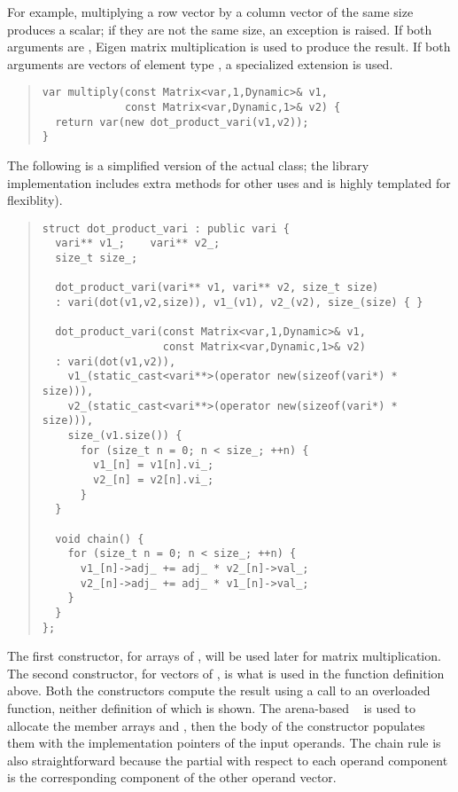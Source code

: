 \documentclass[10pt]{article}
\begin{document}
For example, multiplying a row vector by a column vector of the same
size produces a scalar; if they are not the same size, an exception is
raised.  If both arguments are , Eigen matrix
multiplication is used to produce the result.  If both arguments are
vectors of element type , a specialized 
extension is used.
%
\begin{quote}
\begin{Verbatim}
var multiply(const Matrix<var,1,Dynamic>& v1,
             const Matrix<var,Dynamic,1>& v2) {
  return var(new dot_product_vari(v1,v2));
}
\end{Verbatim}
\end{quote}
%
The following is a simplified version of the actual
 class; the library implementation includes
extra methods for other uses and is highly templated for flexiblity).
%
\begin{quote}
\begin{Verbatim}
struct dot_product_vari : public vari {
  vari** v1_;    vari** v2_;
  size_t size_;
  
  dot_product_vari(vari** v1, vari** v2, size_t size) 
  : vari(dot(v1,v2,size)), v1_(v1), v2_(v2), size_(size) { }

  dot_product_vari(const Matrix<var,1,Dynamic>& v1,
                   const Matrix<var,Dynamic,1>& v2)
  : vari(dot(v1,v2)),
    v1_(static_cast<vari**>(operator new(sizeof(vari*) * size))),
    v2_(static_cast<vari**>(operator new(sizeof(vari*) * size))),
    size_(v1.size()) {
      for (size_t n = 0; n < size_; ++n) {
        v1_[n] = v1[n].vi_;  
        v2_[n] = v2[n].vi_;
      }
  }

  void chain() {
    for (size_t n = 0; n < size_; ++n) {
      v1_[n]->adj_ += adj_ * v2_[n]->val_;
      v2_[n]->adj_ += adj_ * v1_[n]->val_;
    }
  }
};
\end{Verbatim}
\end{quote}
%
The first constructor, for arrays of , will be used later
for matrix multiplication.  The second constructor, for vectors of
, is what is used in the function definition above.  Both
the constructors compute the result using a call to an overloaded
function, neither definition of which is shown.  The arena-based
~ is used to allocate the member arrays
 and , then the body of the constructor
populates them with the implementation pointers of the input operands.
The chain rule is also straightforward because the partial with
respect to each operand component is the corresponding component of
the other operand vector.
\end{document}
